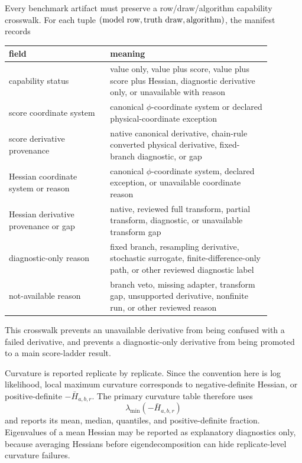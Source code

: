 \documentclass[11pt]{article}
\numberwithin{equation}{section}
\begin{document}
Every benchmark artifact must preserve a row/draw/algorithm capability
crosswalk.  For each tuple
\((\hbox{model row},\hbox{truth draw},\hbox{algorithm})\), the manifest records
\begin{center}
\small
\begin{tabular}{p{0.34\linewidth}p{0.54\linewidth}}
\toprule
field & meaning \\
\midrule
capability status & value only, value plus score, value plus score plus Hessian,
diagnostic derivative only, or unavailable with reason \\
score coordinate system & canonical \(\phi\)-coordinate system or declared
physical-coordinate exception \\
score derivative provenance & native canonical derivative, chain-rule converted
physical derivative, fixed-branch diagnostic, or gap \\
Hessian coordinate system or reason & canonical \(\phi\)-coordinate system,
declared exception, or unavailable coordinate reason \\
Hessian derivative provenance or gap & native, reviewed full transform, partial
transform, diagnostic, or unavailable transform gap \\
diagnostic-only reason & fixed branch, resampling derivative, stochastic
surrogate, finite-difference-only path, or other reviewed diagnostic label \\
not-available reason & branch veto, missing adapter, transform gap, unsupported
derivative, nonfinite run, or other reviewed reason \\
\bottomrule
\end{tabular}
\end{center}
This crosswalk prevents an unavailable derivative from being confused with a
failed derivative, and prevents a diagnostic-only derivative from being promoted
to a main score-ladder result.

Curvature is reported replicate by replicate.  Since the convention here is log
likelihood, local maximum curvature corresponds to negative-definite Hessian, or
positive-definite \(-\bar H_{a,b,r}\).  The primary curvature table therefore
uses
\begin{equation}
  \lambda_{\min}(-\bar H_{a,b,r})
  \label{eq:p40-curvature-statistic}
\end{equation}
and reports its mean, median, quantiles, and positive-definite fraction.
Eigenvalues of a mean Hessian may be reported as explanatory diagnostics only,
because averaging Hessians before eigendecomposition can hide replicate-level
curvature failures.
\end{document}
